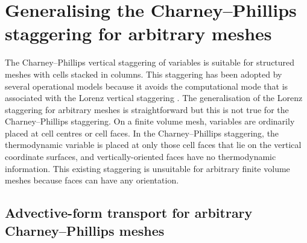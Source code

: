 \chapter{Generalising the Charney–Phillips staggering for arbitrary meshes}
\label{ch:cp}

The Charney--Phillips vertical staggering of variables \citep{charney-phillips1953} is suitable for structured meshes with cells stacked in columns.
This staggering has been adopted by several operational models \citep{davies2005,girard2014,yang2007} because it avoids the computational mode that is associated with the Lorenz vertical staggering \citep{arakawa-konor1996}.
The generalisation of the Lorenz staggering for arbitrary meshes is straightforward \citep{weller-shahrokhi2014} but this is not true for the Charney--Phillips staggering.
On a finite volume mesh, variables are ordinarily placed at cell centres or cell faces. In the Charney--Phillips staggering, the thermodynamic variable is placed at only those cell faces that lie on the vertical coordinate surfaces, and vertically-oriented faces have no thermodynamic information.
This existing staggering is unsuitable for arbitrary finite volume meshes because faces can have any orientation.




\section{Advective-form transport for arbitrary Charney--Phillips meshes}




